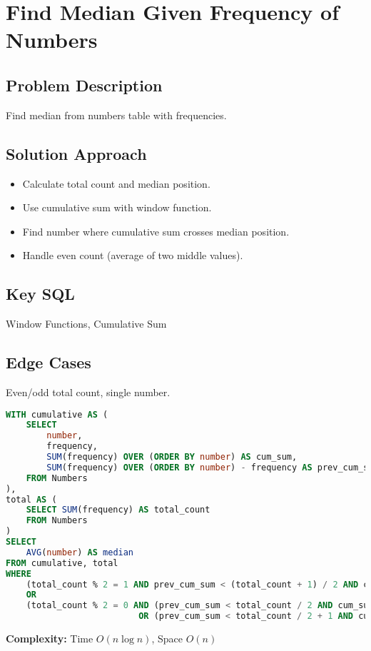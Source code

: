 \documentclass[10pt, a4paper]{article}
\begin{document}
\section{Find Median Given Frequency of Numbers}
\subsection*{Problem Description}
Find median from numbers table with frequencies.

\subsection*{Solution Approach}
\begin{itemize}
    \item Calculate total count and median position.
    \item Use cumulative sum with window function.
    \item Find number where cumulative sum crosses median position.
    \item Handle even count (average of two middle values).
\end{itemize}

\subsection*{Key SQL}
Window Functions, Cumulative Sum

\subsection*{Edge Cases}
Even/odd total count, single number.

\begin{lstlisting}[language=SQL]
WITH cumulative AS (
    SELECT 
        number,
        frequency,
        SUM(frequency) OVER (ORDER BY number) AS cum_sum,
        SUM(frequency) OVER (ORDER BY number) - frequency AS prev_cum_sum
    FROM Numbers
),
total AS (
    SELECT SUM(frequency) AS total_count
    FROM Numbers
)
SELECT
    AVG(number) AS median
FROM cumulative, total
WHERE 
    (total_count % 2 = 1 AND prev_cum_sum < (total_count + 1) / 2 AND cum_sum >= (total_count + 1) / 2)
    OR 
    (total_count % 2 = 0 AND (prev_cum_sum < total_count / 2 AND cum_sum >= total_count / 2)
                          OR (prev_cum_sum < total_count / 2 + 1 AND cum_sum >= total_count / 2 + 1))
\end{lstlisting}
\textbf{Complexity:} Time $O(n \log n)$, Space $O(n)$
\end{document}
